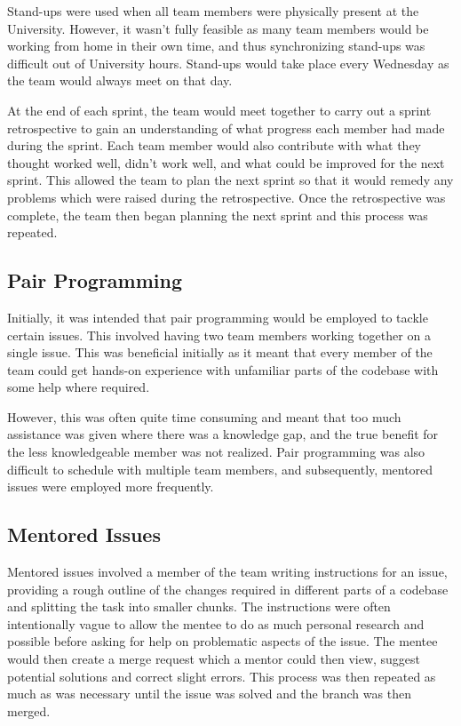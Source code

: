 \documentclass{l3proj}
\begin{document}
Stand-ups were used when all team members were physically present at the University. However, it wasn't fully feasible as many team members would be working from home in their own time, and thus synchronizing stand-ups was difficult out of University hours. Stand-ups would take place every Wednesday as the team would always meet on that day.

At the end of each sprint, the team would meet together to carry out a sprint retrospective to gain an understanding of what progress each member had made during the sprint. Each team member would also contribute with what they thought worked well, didn't work well, and what could be improved for the next sprint. This allowed the team to plan the next sprint so that it would remedy any problems which were raised during the retrospective. Once the retrospective was complete, the team then began planning the next sprint and this process was repeated.

\subsection{Pair Programming}
Initially, it was intended that pair programming would be employed to tackle certain issues. This involved having two team members working together on a single issue. This was beneficial initially as it meant that every member of the team could get hands-on experience with unfamiliar parts of the codebase with some help where required.

However, this was often quite time consuming and meant that too much assistance was given where there was a knowledge gap, and the true benefit for the less knowledgeable member was not realized. Pair programming was also difficult to schedule with multiple team members, and subsequently, mentored issues were employed more frequently.

\subsection{Mentored Issues}
Mentored issues involved a member of the team writing instructions for an issue, providing a rough outline of the changes required in different parts of a codebase and splitting the task into smaller chunks. The instructions were often intentionally vague to allow the mentee to do as much personal research and possible before asking for help on problematic aspects of the issue. The mentee would then create a merge request which a mentor could then view, suggest potential solutions and correct slight errors. This process was then repeated as much as was necessary until the issue was solved and the branch was then merged.
\end{document}
